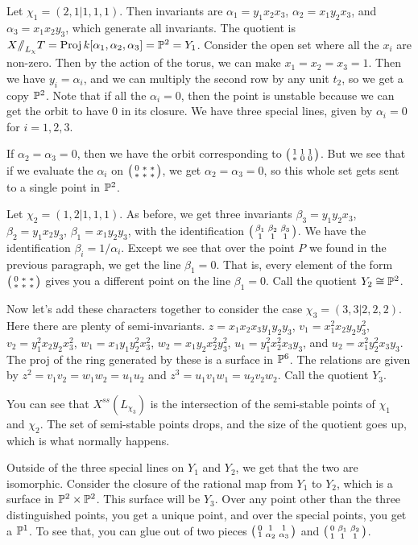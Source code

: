 \begin{example}
 Let $\chi_1=(2,1|1,1,1)$. Then invariants are $\alpha_1=y_1x_2x_3$, $\alpha_2=x_1y_2x_3$, and $\alpha_3=x_1x_2y_3$, which generate all invariants. The quotient is $X\mbox{\rm /\!\!/}_{L_\chi} T = \operatorname{Proj} k[\alpha_1,\alpha_2,\alpha_3]=\mathbb{P}^2=Y_1$. Consider the open set where all the $x_i$ are non-zero. Then by the action of the torus, we can make $x_1=x_2=x_3=1$. Then we have $y_i=\alpha_i$, and we can multiply the second row by any unit $t_2$, so we get a copy $\mathbb{P}^2$. Note that if all the $\alpha_i=0$, then the point is unstable because we can get the orbit to have 0 in its closure. We have three special lines, given by $\alpha_i=0$ for $i=1,2,3$.
 
 If $\alpha_2=\alpha_3=0$, then we have the orbit corresponding to $\bigl(\begin{smallmatrix} 1&1&1\\ *&0&0 \end{smallmatrix}\bigr)$. But we see that if we evaluate the $\alpha_i$ on $\bigl(\begin{smallmatrix} 0&*&*\\ *&*&* \end{smallmatrix}\bigr)$, we get $\alpha_2=\alpha_3=0$, so this whole set gets sent to a single point in $\mathbb{P}^2$.
 
 Let $\chi_2=(1,2|1,1,1)$. As before, we get three invariants $\beta_3=y_1y_2x_3$, $\beta_2=y_1x_2y_3$, $\beta_1=x_1y_2y_3$, with the identification $\bigl(\begin{smallmatrix} \beta_1&\beta_2&\beta_3\\ 1&1&1 \end{smallmatrix}\bigr)$. We have the identification $\beta_i=1/\alpha_i$. Except we see that over the point $P$ we found in the previous paragraph, we get the line $\beta_1=0$. That is, every element of the form $\bigl(\begin{smallmatrix} 0&*&*\\ *&*&* \end{smallmatrix}\bigr)$ gives you a different point on the line $\beta_1=0$. Call the quotient $Y_2\cong \mathbb{P}^2$.
 
 Now let's add these characters together to consider the case $\chi_3=(3,3|2,2,2)$. Here there are plenty of semi-invariants. $z=x_1x_2x_3y_1y_2y_3$, $v_1=x_1^2x_2y_2y_3^2$, $v_2=y_1^2x_2y_2x_3^2$, $w_1=x_1y_1y_2^2x_3^2$, $w_2=x_1y_2x_2^2y_3^2$, $u_1=y_1^2x_2^2x_3y_3$, and $u_2=x_1^2y_2^2x_3y_3$. The proj of the ring generated by these is a surface in $\mathbb{P}^6$. The relations are given by $z^2=v_1v_2=w_1w_2=u_1u_2$ and $z^3=u_1v_1w_1=u_2v_2w_2$. Call the quotient $Y_3$.
 
 You can see that $X^{ss}(L_{\chi_3})$ is the intersection of the semi-stable points of $\chi_1$ and $\chi_2$. The set of semi-stable points drops, and the size of the quotient goes up, which is what normally happens.
 
 Outside of the three special lines on $Y_1$ and $Y_2$, we get that the two are isomorphic. Consider the closure of the rational map from $Y_1$ to $Y_2$, which is a surface in $\mathbb{P}^2\times\mathbb{P}^2$. This surface will be $Y_3$. Over any point other than the three distinguished points, you get a unique point, and over the special points, you get a $\mathbb{P}^1$. To see that, you can glue out of two pieces $\bigl(\begin{smallmatrix} 0&1&1\\ 1&\alpha_2&\alpha_3 \end{smallmatrix}\bigr)$ and $\bigl(\begin{smallmatrix} 0&\beta_1&\beta_2\\ 1&1&1 \end{smallmatrix}\bigr)$.
 

\end{example}
